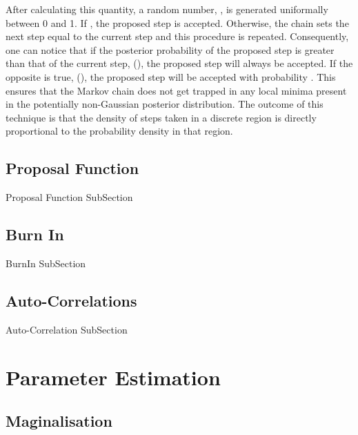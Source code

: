 After calculating this quantity, a random number, \quickmath{\beta}, is generated uniformally between 0 and 1. If , the proposed step is accepted. Otherwise, the chain sets the next step equal to the current step and this procedure is repeated. Consequently, one can notice that if the posterior probability of the proposed step is greater than that of the current step, (), the proposed step will always be accepted. If the opposite is true, (), the proposed step will be accepted with probability . This ensures that the Markov chain does not get trapped in any local minima present in the potentially non-Gaussian posterior distribution. The outcome of this technique is that the density of steps taken in a discrete region is directly proportional to the probability density in that region.

\subsection{Proposal Function}
\label{sec:MarkovChainMonteCarlo_ProposalFunction}
Proposal Function SubSection

\subsection{Burn In}
\label{sec:MarkovChainMonteCarlo_BurnIn}
BurnIn SubSection

\subsection{Auto-Correlations}
\label{sec:MarkovChainMonteCarlo_AutoCorrelations}
Auto-Correlation SubSection

\section{Parameter Estimation}
\label{sec:MarkovChainMonteCarlo_ParameterEstimation}

\subsection{Maginalisation}
\label{sec:MarkovChainMonteCarlo_Marginalisation}
